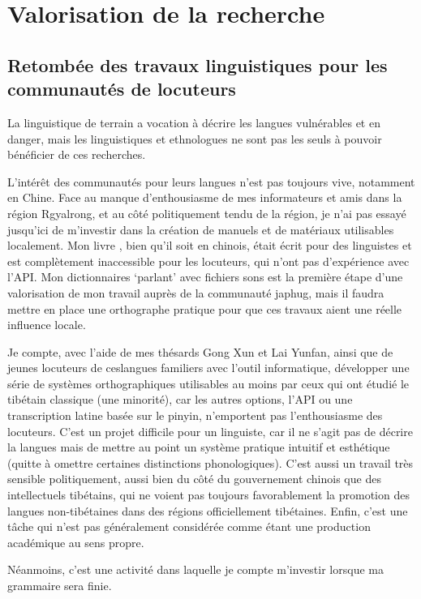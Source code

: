 \documentclass[oldfontcommands,oneside,a4paper,11pt]{article}
\begin{document}
\section{Valorisation de la recherche}

\subsection{Retombée des travaux linguistiques pour les communautés de locuteurs}
La linguistique de terrain a vocation à décrire les langues vulnérables et en danger, mais les linguistiques et ethnologues ne sont pas les seuls à pouvoir bénéficier de ces recherches.

L'intérêt des communautés pour leurs langues n'est pas toujours vive, notamment en Chine. Face au manque d'enthousiasme de mes informateurs et amis dans la région Rgyalrong, et au côté politiquement tendu de la région, je n'ai pas essayé jusqu'ici de m'investir dans la création de manuels et de matériaux utilisables localement. Mon livre \citet{jacques08zh}, bien qu'il soit en chinois, était écrit pour des linguistes et est complètement inaccessible pour les locuteurs, qui n'ont pas d'expérience avec l'API. Mon dictionnaires `parlant' avec fichiers sons est la première étape d'une valorisation de mon travail auprès de la communauté japhug, mais il faudra mettre en place une orthographe pratique pour que ces travaux aient une réelle influence locale.

Je compte, avec l'aide de mes thésards Gong Xun et Lai Yunfan, ainsi que de jeunes locuteurs de ceslangues familiers avec l'outil informatique, développer une série de systèmes orthographiques utilisables au moins par ceux qui ont étudié le tibétain classique (une minorité), car les autres options, l'API ou une transcription latine basée sur le pinyin, n'emportent pas l'enthousiasme des locuteurs. C'est un projet difficile pour un linguiste, car il ne s'agit pas de décrire la langues mais de mettre au point un système pratique intuitif et esthétique (quitte à omettre certaines distinctions phonologiques). C'est aussi un travail très sensible politiquement, aussi bien du côté du gouvernement chinois que des intellectuels tibétains, qui ne voient pas toujours favorablement la promotion des langues non-tibétaines dans des régions officiellement tibétaines. Enfin, c'est une tâche qui n'est pas généralement considérée comme étant une production académique au sens propre. 

Néanmoins, c'est une activité dans laquelle je compte m'investir lorsque ma grammaire sera finie.
\end{document}
